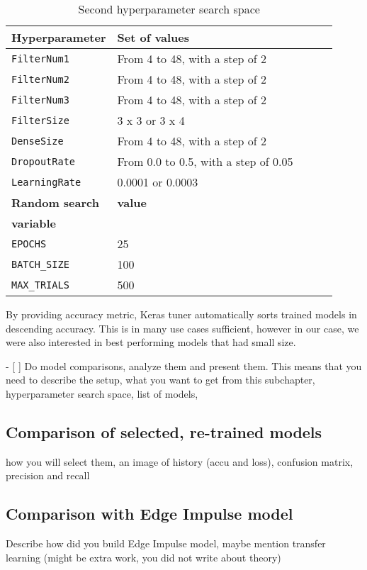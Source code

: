 \begin{table}
    \centering
    \begin{tabular}{@{} *5l @{}}    \toprule
        \textbf{Hyperparameter} & \textbf{Set of values}\\\midrule
        \verb|FilterNum1|       & From 4 to 48, with a step of 2\\ 
        \verb|FilterNum2|       & From 4 to 48, with a step of 2\\ 
        \verb|FilterNum3|       & From 4 to 48, with a step of 2\\
        \verb|FilterSize|       & 3 x 3 or 3 x 4\\
        \verb|DenseSize|        & From 4 to 48, with a step of 2\\
        \verb|DropoutRate|      & From 0.0 to 0.5, with a step of 0.05\\
        \verb|LearningRate|     & 0.0001 or 0.0003\\\toprule
        \textbf{Random search}  & \textbf{value}\\
        \textbf{variable}       & \\\midrule
        \verb|EPOCHS|           & 25\\
        \verb|BATCH_SIZE|       & 100\\
        \verb|MAX_TRIALS|       & 500\\\bottomrule
    \end{tabular}
    \caption{ Second hyperparameter search space}
    \label{hyper_table2}
\end{table}

By providing accuracy metric, Keras tuner automatically sorts trained models in descending accuracy.
This is in many use cases sufficient, however in our case, we were also interested in best performing models that had small size. 

- [ ] Do model comparisons, analyze them and present them.
      This means that you need to describe the setup, 
      what you want to get from this subchapter, 
      hyperparameter search space, 
      list of models, 

\subsection{ Comparison of selected, re-trained models}
      how you will select them, 
      an image of history (accu and loss), 
    confusion matrix,
    precision and recall
\subsection{ Comparison with Edge Impulse model}
Describe how did you build Edge Impulse model, maybe mention transfer learning (might be extra work, you did not write about theory)




